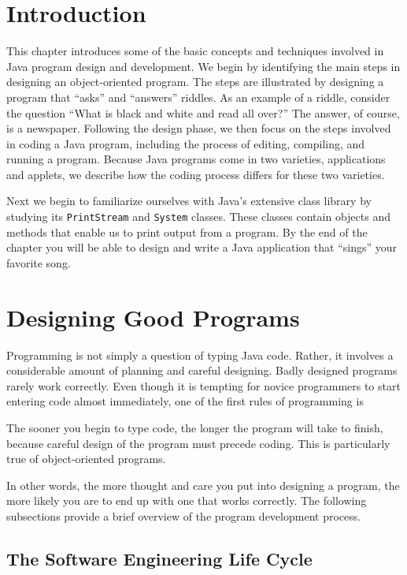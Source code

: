 \section{Introduction}

\noindent This chapter  introduces some of the basic 
concepts and techniques involved in Java program design and
development.  We begin by identifying the main steps in designing an
object-oriented program. The steps are illustrated by designing a
program that ``asks'' and ``answers'' riddles. As an example of a
riddle, consider the question ``What is black and white and read all
over?''  The answer, of course, is a newspaper.  Following the design
phase, we then focus on the steps involved in coding a Java program,
including the process of editing, compiling, and running a
program. Because Java programs come in two varieties, applications and
applets, we describe how the coding process differs for these two
varieties.

Next we begin to familiarize ourselves with Java's extensive class
library by studying its {\tt PrintStream} and {\tt System}
classes.  These classes contain objects and methods that enable us to
print output from a program.  By the end of the chapter you will be
able to design and write a Java application that ``sings'' your
favorite song. 

\section{Designing Good Programs}

\noindent Programming is not simply a question of typing Java code.
Rather, it involves a considerable amount of planning and careful
designing.  Badly designed programs rarely work correctly.  Even
though it is tempting for novice programmers to start entering code
almost immediately, one of the first rules of programming is

%
{The sooner you begin to type code, the longer the program will take to
finish, because careful design of the program must precede
coding. This is particularly true of object-oriented programs.}

\noindent In other words, the more thought and care you put into
designing a program, the more likely you are to end up with one
that works correctly.  The following subsections provide a brief overview
of the program development process.

\subsection{The Software Engineering Life Cycle}

